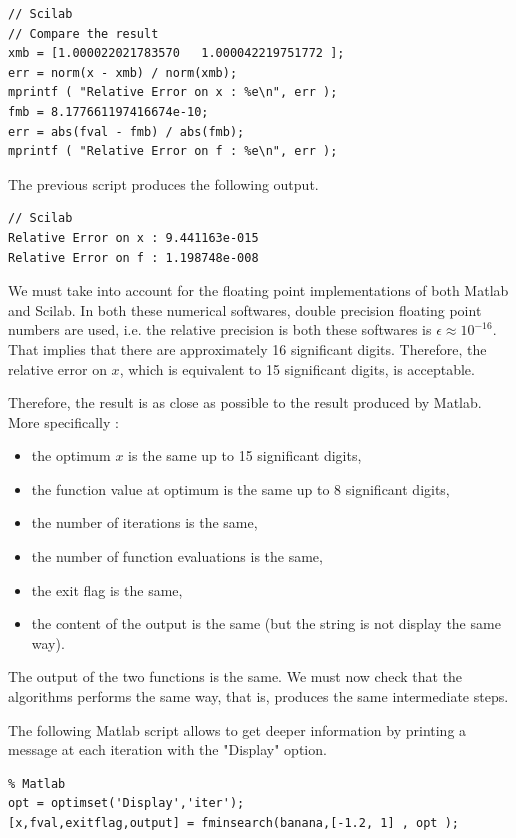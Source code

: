 \lstset{language=scilabscript}
\begin{lstlisting}
// Scilab
// Compare the result
xmb = [1.000022021783570   1.000042219751772 ];
err = norm(x - xmb) / norm(xmb);
mprintf ( "Relative Error on x : %e\n", err );
fmb = 8.177661197416674e-10;
err = abs(fval - fmb) / abs(fmb);
mprintf ( "Relative Error on f : %e\n", err );
\end{lstlisting}

The previous script produces the following output.

\lstset{language=scilabscript}
\begin{lstlisting}
// Scilab
Relative Error on x : 9.441163e-015
Relative Error on f : 1.198748e-008
\end{lstlisting}

We must take into account for the floating point implementations 
of both Matlab and Scilab. In both these numerical softwares,
double precision floating point numbers are used, i.e. the relative 
precision is both these softwares is $\epsilon \approx 10^{-16}$. 
That implies that there are approximately 16 significant digits.
Therefore, the relative error on $x$, which is equivalent to 15
significant digits, is acceptable. 

Therefore, the result is as close as possible to the result produced 
by Matlab. More specifically :
\begin{itemize}
\item the optimum $x$ is the same up to 15 significant digits,
\item the function value at optimum is the same up to 8 significant digits,
\item the number of iterations is the same,
\item the number of function evaluations is the same,
\item the exit flag is the same,
\item the content of the output is the same (but the string is not 
display the same way).
\end{itemize}

The output of the two functions is the same. 
We must now check that the algorithms performs the same way,
that is, produces the same intermediate steps.

The following Matlab script allows to get deeper information by printing a message at each iteration
with the "Display" option.


\lstset{language=matlabscript}
\begin{lstlisting}
% Matlab
opt = optimset('Display','iter');
[x,fval,exitflag,output] = fminsearch(banana,[-1.2, 1] , opt );
\end{lstlisting}

